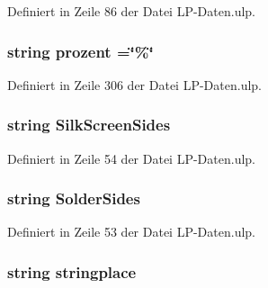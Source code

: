 Definiert in Zeile 86 der Datei L\+P-\/\+Daten.\+ulp.

\hypertarget{_l_p-_daten_8ulp_afdee5162eb7fe666bc58db923329bce0}{}
\subsubsection[{prozent}]{\setlength{\rightskip}{0pt plus 5cm}string prozent =\char`\"{}\%\char`\"{}}\label{_l_p-_daten_8ulp_afdee5162eb7fe666bc58db923329bce0}


Definiert in Zeile 306 der Datei L\+P-\/\+Daten.\+ulp.

\hypertarget{_l_p-_daten_8ulp_a068caacbc00a614d6a25116869947d1d}{}
\subsubsection[{Silk\+Screen\+Sides}]{\setlength{\rightskip}{0pt plus 5cm}string Silk\+Screen\+Sides}\label{_l_p-_daten_8ulp_a068caacbc00a614d6a25116869947d1d}


Definiert in Zeile 54 der Datei L\+P-\/\+Daten.\+ulp.

\hypertarget{_l_p-_daten_8ulp_a327297b10a43bf8d17cec85de6cfa488}{}
\subsubsection[{Solder\+Sides}]{\setlength{\rightskip}{0pt plus 5cm}string Solder\+Sides}\label{_l_p-_daten_8ulp_a327297b10a43bf8d17cec85de6cfa488}


Definiert in Zeile 53 der Datei L\+P-\/\+Daten.\+ulp.

\hypertarget{_l_p-_daten_8ulp_a335f3f5797df717de135253cb99f2173}{}
\subsubsection[{stringplace}]{\setlength{\rightskip}{0pt plus 5cm}string stringplace}\label{_l_p-_daten_8ulp_a335f3f5797df717de135253cb99f2173}


